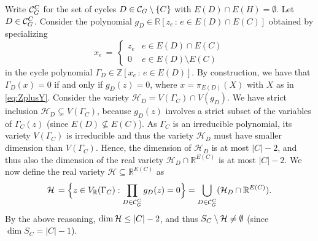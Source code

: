 \documentclass[a4paper, 11pt, twoside]{article}
\newcommand{\R}{\mathbb{R}}
\newcommand{\MC}{{\mathcal C}}
\newcommand{\MH}{{\mathcal H}}
\theoremstyle{plain}
\begin{document}
Write ${\cal C}_G^C$ for the set of cycles $D\in {\cal C}_G \setminus \{C\}$ with $E(D)\cap E(H)=\emptyset$.
Let $D \in {\cal C}_G^C$. Consider the polynomial $g_D \in \mathbb{R}[z_e \, : \, e \in E(D) \cap E(C)]$ obtained by specializing
\[ x_e \, = \, \begin{cases} z_e & e \in E(D)\cap E(C) \\ 
0 & e \in E(D) \setminus E(C)
\end{cases}\]
in the cycle polynomial $\Gamma_D \in \mathbb{Z}[x_e \, : \, e \in E(D)]$. By construction, we have that $\Gamma_D(x) = 0$ if and only if $g_D(z) = 0$, where $x = 
\pi_{E(D)}(X)$ with $X$ as in \eqref{eq:ZplusY}. 
Consider the   variety  $\MH_D=V(\Gamma_C) \cap V(g_D)$.  We have strict inclusion  $\MH_D\subsetneq V(\Gamma_C)$, because   
 $g_D(z)$ involves a strict subset of the variables of $\Gamma_C(z)$ (since $E(D)\not\subseteq E(C)$). As $\Gamma_C$ is an irreducible polynomial, its variety $V(\Gamma_C)$ is irreducible and thus the variety $\MH_D$ must have smaller dimension than $V(\Gamma_C)$. Hence, the dimension of $\MH_D$ is at most $|C|-2$, and thus also the dimension of the real variety $\MH_D\cap\R^{E(C)}$ is at most $|C|-2$.
We now define the  real variety $\MH\subseteq \R^{E(C)}$ as  
\[ {\cal H} \, =  \Big\{z\in V_\R(\Gamma_C): \prod_{D \in {\cal C}^C_G} g_D(z) = 0\Big\}
=\bigcup_{D\in\MC^C_G} (\MH_D\cap\R^{E(C)}).\]
By the above reasoning,   $\dim {\cal H}  \leq |C| - 2$, and thus $S_C \setminus {\cal H} \neq \emptyset$ 
 (since $\dim S_C =|C|-1$).
\end{document}
